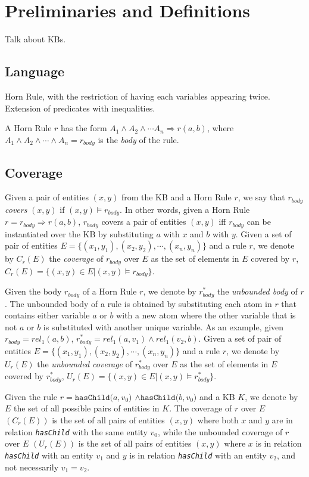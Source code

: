 \section{Preliminaries and Definitions}
{\color{red} Talk about KBs.}

\subsection{Language}
{\color{red} Horn Rule, with the restriction of having each variables appearing twice.
Extension of predicates with inequalities.}

A Horn Rule $r$ has the form $A_1 \wedge A_2 \wedge \cdots A_n \Rightarrow r(a,b)$, where  $A_1 \wedge A_2 \wedge \cdots \wedge A_n = r_{body}$ is the \emph{body} of the rule.

\subsection{Coverage}
Given a pair of entities $(x,y)$ from the KB and a Horn Rule $r$, we say that $r_{body}$ \emph{covers} $(x,y)$ if
$(x,y) \models r_{body}$. In other words, given a Horn Rule $r = r_{body} \Rightarrow r(a,b)$, $r_{body}$ covers a pair of entities $(x,y)$ iff $r_{body}$ can be instantiated over the KB by substituting $a$ with $x$ and $b$ with $y$. Given a set of pair of entities $E = \{(x_1,y_1),(x_2,y_2),\cdots,(x_n,y_n)\}$ and a rule $r$, we denote by $C_r(E)$ the \emph{coverage} of $r_{body}$ over $E$ as the set of elements in $E$ covered by $r$, $C_r(E)=\{(x,y) \in E | (x,y) \models r_{body}\}$.

Given the body $r_{body}$ of a Horn Rule $r$, we denote by $r^{*}_{body}$ the \emph{unbounded body} of $r$. The unbounded body of a rule is obtained by substituting each atom in $r$ that contains either variable $a$ or $b$ with a new atom where the other variable that is not $a$ or $b$ 
is substituted with another unique variable. As an example, given $r_{body} = rel_1(a,b)$, $r^{*}_{body} = rel_1(a,v_1) \wedge rel_1(v_2,b)$. 
Given a set of pair of entities $E = \{(x_1,y_1),(x_2,y_2),\cdots,(x_n,y_n)\}$ and a rule $r$, we denote by $U_r(E)$ the \emph{unbounded coverage} of $r^{*}_{body}$ over $E$ as the set of elements in $E$ covered by $r^{*}_{body}$, $U_r(E)=\{(x,y) \in E | (x,y) \models r^{*}_{body}\}$.

\begin{myExample}
	Given the rule \emph{$r=\texttt{hasChild(}a,v_0\texttt{)} $ $\wedge \texttt{hasChild(}b,v_0\texttt{)}$} and a KB $K$, we denote by $E$ the set of all possible pairs of entities in $K$.
	 The coverage of $r$ over $E$ $(C_r(E))$ is the set of all pairs of entities $(x,y)$ where both $x$ and $y$ are in relation \emph{\texttt{hasChild}} with the same entity $v_0$, while the unbounded coverage of $r$ over $E$ $(U_r(E))$ is the set of all pairs of entities $(x,y)$ where $x$ is in relation \emph{\texttt{hasChild}} with an entity $v_1$ and $y$ is in relation \emph{\texttt{hasChild}} with an entity $v_2$, and not necessarily $v_1 = v_2$. 
\end{myExample}

